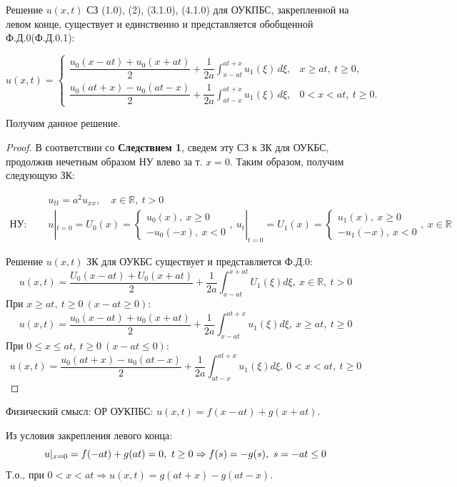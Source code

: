 \begin{theorem}
	Решение $u(x, t)$ СЗ (1.0), (2), (3.1.0), (4.1.0) для ОУКПБС, закрепленной на левом конце, существует и единственно и представляется обобщенной Ф.Д.0(Ф.Д.0.1):
\end{theorem}

\[
	u(x,t)=
	\begin{cases}
		\dfrac{u_0(x-at)+u_0(x+at)}{2}+\dfrac{1}{2a}\displaystyle\int_{x-at}^{at+x} u_1(\xi)\,d\xi, & x\ge at,\ t\ge 0, \\[1.2em]
		\dfrac{u_0(at+x)-u_0(at-x)}{2}+\dfrac{1}{2a}\displaystyle\int_{at-x}^{at+x} u_1(\xi)\,d\xi, & 0<x<at,\ t\ge 0.
	\end{cases}
\]

Получим данное решение.
\begin{proof}
	В соответствии со \textbf{Следствием 1}, сведем эту СЗ к ЗК для ОУКБС, продолжив нечетным образом НУ влево за т. $x=0$. Таким образом, получим следующую ЗК:

	\begin{align*}
		                    & u_{tt} = a^2 u_{xx}, \quad x \in \mathbb{R},\ t > 0 \tag{1.0} \\
		\textbf{НУ: } \quad & u|_{t=0}=U_0(x)=
		\begin{cases}
			u_0(x),\ x \ge 0 \\
			-u_0(-x),\ x < 0
		\end{cases}
		,\ u_t|_{t=0}=U_1(x) =
		\begin{cases}
			u_1(x),\ x \ge 0 \\
			-u_1(-x),\ x < 0
		\end{cases},
		\ x \in \mathbb{R} \tag{2}
	\end{align*}

	Решение $u(x, t)$ ЗК для ОУКБС существует и представляется Ф.Д.0:
	\[
		u(x, t) = \frac{U_0(x-at) + U_0(x+at)}{2} + \frac{1}{2a} \int_{x-at}^{x+at} U_1(\xi) d\xi,\ x \in \mathbb{R},\ t > 0
	\]
	При $x \ge at,\ t \ge 0\ (x-at \ge 0)$:
	\[
		u(x, t) = \frac{u_0(x-at) + u_0(x+at)}{2} + \frac{1}{2a} \int_{x-at}^{at+x} u_1(\xi) d\xi,\ x \ge at,\ t \ge 0
	\]
	При $0 \le x \le at,\ t \ge 0\ (x-at \le 0)$:
	\[
		u(x, t) = \frac{u_0(at+x) - u_0(at-x)}{2} + \frac{1}{2a} \int_{at-x}^{at+x} u_1(\xi) d\xi,\ 0 < x < at,\ t \ge 0
	\]
\end{proof}

Физический смысл: ОР ОУКПБС: $u(x, t) = f(x-at) + g(x+at)$.

Из условия закрепления левого конца:
\[
	u|_{x=0} = f(-at) + g(at) = 0,\ t \ge 0 \Rightarrow \\
	f(s) = -g(s),\ s=-at \le 0
\]
Т.о., при $0 < x < at \Rightarrow u(x, t) = g(at + x) - g(at - x)$.

